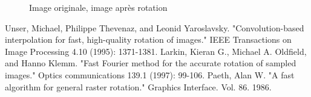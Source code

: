 \documentclass[12pt]{article}
\begin{document}
\begin{figure}[h]
  \caption{Image originale, image après rotation}
\end{figure}

\begin{thebibliography}{2}

  Unser, Michael, Philippe Thevenaz, and Leonid Yaroslavsky. 
  "Convolution-based interpolation for fast, high-quality rotation of images." 
  IEEE Transactions on Image Processing 4.10 (1995): 1371-1381.
  Larkin, Kieran G., Michael A. Oldfield, and Hanno Klemm. 
  "Fast Fourier method for the accurate rotation of sampled images." 
  Optics communications 139.1 (1997): 99-106.
	Paeth, Alan W. 
	"A fast algorithm for general raster rotation." 
	Graphics Interface. Vol. 86. 1986.

\end{thebibliography}
\end{document}
